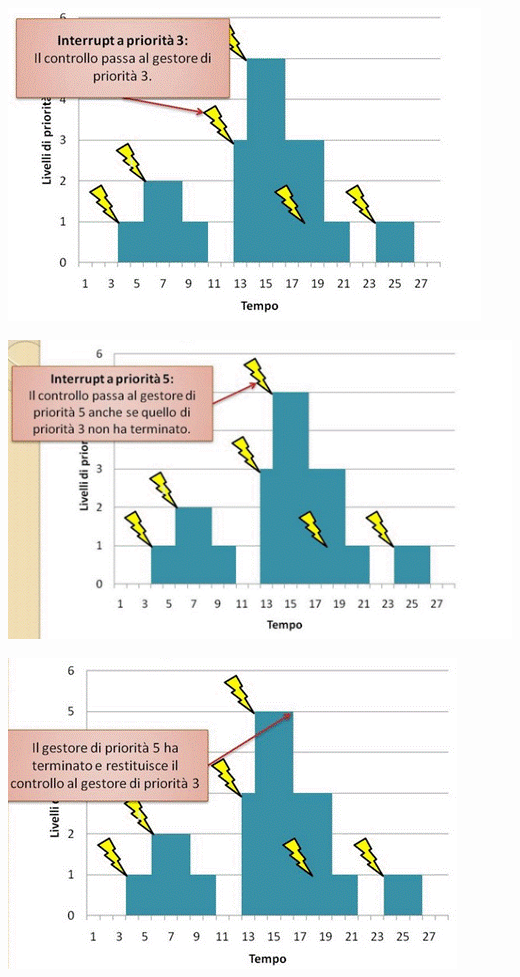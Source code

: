 \documentclass[a4paper,12pt, oneside]{book}
\begin{document}
\begin{center}
  \includegraphics[scale = 0.6]{img/int6.png}
\end{center}
\begin{center}
  \includegraphics[scale = 0.6]{img/int7.png}
\end{center}
\begin{center}
  \includegraphics[scale = 0.6]{img/int8.png}
\end{center}
\end{document}
